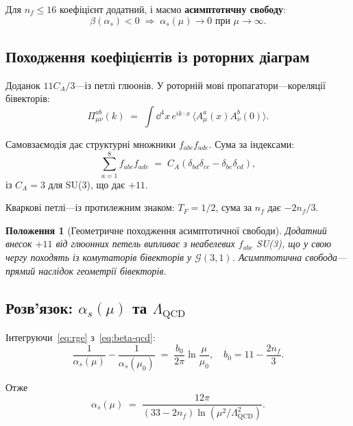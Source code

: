 \documentclass[11pt,a4paper]{article}
\newcommand{\Cl}{\mathcal{G}}
\theoremstyle{definition}
\theoremstyle{plain}
\newtheorem{proposition}{Положення}[section]
\theoremstyle{remark}
\begin{document}
Для $n_f\le 16$ коефіцієнт додатний, і маємо \textbf{асимптотичну свободу}:
\begin{equation}
\beta(\alpha_s)<0 \;\Rightarrow\; \alpha_s(\mu)\to 0 \text{ при } \mu\to\infty.
\end{equation}

\subsection{Походження коефіцієнтів із роторних діаграм}

Доданок $11C_A/3$—із петлі глюонів. У роторній мові пропагатори—кореляції бівекторів:
\begin{equation}
\Pi_{\mu\nu}^{ab}(k) \;=\; \int \dd^4x \, e^{ik \cdot x}\,\langle A_\mu^a(x) A_\nu^b(0) \rangle.
\end{equation}

Самовзаємодія дає структурні множники $f_{abc}f_{ade}$. Сума за індексами:
\begin{equation}
\sum_{a=1}^8 f_{abc}f_{ade} \;=\; C_A(\delta_{bd}\delta_{ce} - \delta_{be}\delta_{cd}),
\end{equation}
із $C_A=3$ для SU(3), що дає $+11$.

Кваркові петлі—із протилежним знаком: $T_F=1/2$, сума за $n_f$ дає $-2n_f/3$.

\begin{proposition}[Геометричне походження асимптотичної свободи]
Додатний внесок $+11$ від глюонних петель випливає з неабелевих $f_{abc}$ SU(3), що у свою чергу походять із комутаторів бівекторів у $\Cl(3,1)$. Асимптотична свобода—прямий наслідок геометрії бівекторів.
\end{proposition}

\subsection{Розв’язок: $\alpha_s(\mu)$ та $\Lambda_{\mathrm{QCD}}$}

Інтегруючи~\eqref{eq:rge} з~\eqref{eq:beta-qcd}:
\begin{equation}
\frac{1}{\alpha_s(\mu)} - \frac{1}{\alpha_s(\mu_0)} \;=\; \frac{b_0}{2\pi}\ln\frac{\mu}{\mu_0},\quad b_0=11-\frac{2n_f}{3}.
\end{equation}

Отже
\begin{equation}
\alpha_s(\mu) \;=\; \frac{12\pi}{(33 - 2n_f)\ln(\mu^2/\Lambda_{\mathrm{QCD}}^2)}.
\label{eq:running-coupling}
\end{equation}
\end{document}
